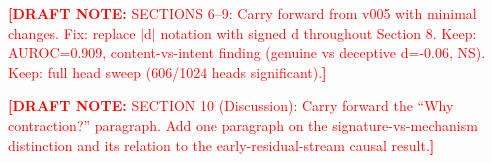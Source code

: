\documentclass{article}
\newcommand{\draftnote}[1]{\noindent\textcolor{red}{\small\textbf{[DRAFT NOTE:} #1\textbf{]}}\medskip}
\begin{document}
\draftnote{SECTIONS 6–9: Carry forward from v005 with minimal changes.
Fix: replace $|$d$|$ notation with signed d throughout Section 8.
Keep: AUROC=0.909, content-vs-intent finding (genuine vs deceptive d=-0.06, NS).
Keep: full head sweep (606/1024 heads significant).}

\draftnote{SECTION 10 (Discussion): Carry forward the ``Why contraction?'' paragraph.
Add one paragraph on the signature-vs-mechanism distinction and its relation to the
early-residual-stream causal result.}




\end{document}
